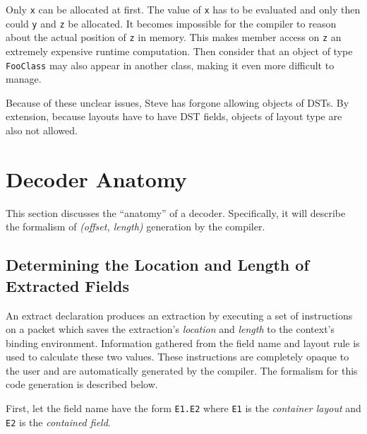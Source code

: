 Only \texttt{x} can be allocated at first. The value of \texttt{x} has to be evaluated
and only then could \texttt{y} and \texttt{z} be allocated. It becomes impossible
for the compiler to reason about the actual position of \texttt{z} in memory. This 
makes member access on \texttt{z} an extremely expensive runtime computation.
Then consider that an object of type \texttt{FooClass} may also appear in
another class, making it even more difficult to manage.

Because of these unclear issues, Steve has forgone allowing objects of DSTs.
By extension, because layouts have to have DST fields, objects of layout type
are also not allowed.


\section{Decoder Anatomy} \label{decoder_anatomy}

This section discusses the ``anatomy'' of a decoder.
Specifically, it will describe the formalism of \textit{(offset, length)} generation by the compiler.

\subsection{Determining the Location and Length of Extracted Fields}

An extract declaration produces an extraction by executing a set of instructions on a packet which saves the extraction's \textit{location} and \textit{length} to the context's binding environment. Information gathered from the field name and layout rule is used to calculate these two values. These instructions are completely opaque to the user and are automatically generated by the compiler. The formalism for this code generation is described below.

First, let the field name have the form \texttt{E1.E2} where \texttt{E1} is the \textit{container layout} and \texttt{E2} is the \textit{contained field}.


